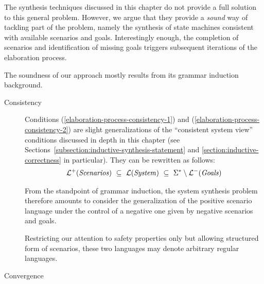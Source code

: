 The synthesis techniques discussed in this chapter do not provide a full solution to this general problem. However, we argue that they provide a \emph{sound} way of tackling part of the problem, namely the synthesis of state machines consistent with available scenarios and goals. Interestingly enough, the completion of scenarios and identification of missing goals triggers subsequent iterations of the elaboration process.

The soundness of our approach mostly results from its grammar induction background.
\begin{description}
\item[Consistency] Conditions (\ref{elaboration-process-consistency-1}) and (\ref{elaboration-process-consistency-2}) are slight generalizations of the ``consistent system view'' conditions discussed in depth in this chapter (see Sections~\ref{subsection:inductive-synthesis-statement} and \ref{section:inductive-correctness} in particular). They can be rewritten as follows:
\begin{align}
\mathcal{L}^+(\mbox{\emph{Scenarios}})~\subseteq~\mathcal{L}(\mbox{\emph{System}})~\subseteq~\Sigma^* \setminus \mathcal{L}^-(\mbox{\emph{Goals}})
\end{align}

From the standpoint of grammar induction, the system synthesis problem therefore amounts to consider the generalization of the positive scenario language under the control of a negative one given by negative scenarios and goals. 

Restricting our attention to safety properties only but allowing structured form of scenarios, these two languages may denote arbitrary regular languages. 

\item[Convergence]
\end{description}





